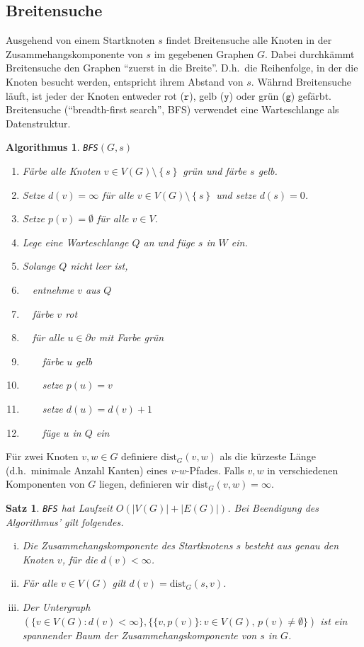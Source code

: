 \documentclass[10pt,reqno]{amsart}
\numberwithin{equation}{section}
\newcommand\nix{\,\cdot\,}
\newtheorem{theorem}[definition]{Satz}
\newtheorem{algorithm}[definition]{Algorithmus}
\newcommand\dist{\mathrm{dist}}
\newcommand\cbc[1]{\left\{{#1}\right\}}
\begin{document}
\subsection{Breitensuche}\label{sec_bfs}
Ausgehend von einem Startknoten $s$ findet Breitensuche alle Knoten in der Zusammehangskomponente von $s$ im gegebenen Graphen $G$.
Dabei durchk\"ammt Breitensuche den Graphen ``zuerst in die Breite''.
D.h.\ die Reihenfolge, in der die Knoten besucht werden, entspricht ihrem Abstand von $s$.
W\"ahrnd Breitensuche l\"auft, ist jeder der Knoten entweder rot ($\mathtt r$), gelb ($\mathtt y$) oder gr\"un ($\mathtt g$) gef\"arbt.
Breitensuche (``breadth-first search'', BFS) verwendet eine Warteschlange als Datenstruktur.

\begin{algorithm}{\tt BFS}$(G,s)$
	\begin{enumerate}
		\item F\"arbe alle Knoten $v\in V(G)\setminus\cbc s$ gr\"un und f\"arbe $s$ gelb.
		\item Setze $d(v)=\infty$ f\"ur alle $v\in V(G)\setminus\cbc s$ und setze $d(s)=0$.
		\item Setze $p(v)=\emptyset$ f\"ur alle $v\in V$.
		\item Lege eine Warteschlange $Q$ an und f\"uge $s$ in $W$ ein.
		\item Solange $Q$ nicht leer ist,
		\item $\quad$entnehme $v$ aus $Q$
		\item $\quad$f\"arbe $v$ rot
		\item $\quad$f\"ur alle $u\in\partial v$ mit Farbe gr\"un
		\item $\quad\quad$f\"arbe $u$ gelb
		\item $\quad\quad$setze $p(u)=v$
		\item $\quad\quad$setze $d(u)=d(v)+1$
		\item $\quad\quad$f\"uge $u$ in $Q$ ein
	\end{enumerate}
\end{algorithm}

F\"ur zwei Knoten $v,w\in G$ definiere $\dist_G(v,w)$ als die k\"urzeste L\"ange (d.h.\ minimale Anzahl Kanten) eines $v$-$w$-Pfades.
Falls $v,w$ in verschiedenen Komponenten von $G$ liegen, definieren wir $\dist_G(v,w)=\infty$.

\begin{theorem}\label{Thm_BFS}
	{\tt BFS} hat Laufzeit $O(|V(G)|+|E(G)|)$.
	Bei Beendigung des Algorithmus' gilt folgendes.
	\begin{enumerate}[(i)]
		\item Die Zusammehangskomponente des Startknotens $s$ besteht aus genau den Knoten $v$, f\"ur die $d(v)<\infty$.
		\item F\"ur alle $v\in V(G)$ gilt $d(v)=\dist_G(s,v)$.
		\item Der Untergraph $(\{v\in V(G):d(v)<\infty\},\{\{v,p(v)\}:v\in V(G),\,p(v)\neq\emptyset\})$ ist ein spannender Baum der Zusammehangskomponente von $s$ in $G$.
	\end{enumerate}
\end{theorem}
\end{document}

